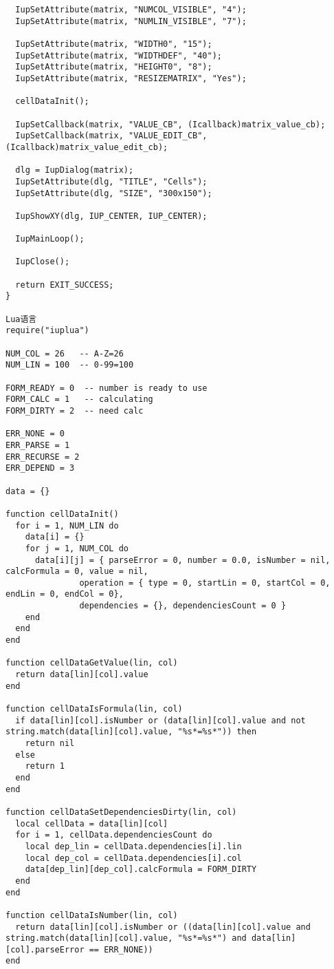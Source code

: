 \documentclass{ctexart}
\begin{document}
\begin{lstlisting}
  IupSetAttribute(matrix, "NUMCOL_VISIBLE", "4");
  IupSetAttribute(matrix, "NUMLIN_VISIBLE", "7");

  IupSetAttribute(matrix, "WIDTH0", "15");
  IupSetAttribute(matrix, "WIDTHDEF", "40");
  IupSetAttribute(matrix, "HEIGHT0", "8");
  IupSetAttribute(matrix, "RESIZEMATRIX", "Yes");

  cellDataInit();

  IupSetCallback(matrix, "VALUE_CB", (Icallback)matrix_value_cb);
  IupSetCallback(matrix, "VALUE_EDIT_CB", (Icallback)matrix_value_edit_cb);

  dlg = IupDialog(matrix);
  IupSetAttribute(dlg, "TITLE", "Cells");
  IupSetAttribute(dlg, "SIZE", "300x150");

  IupShowXY(dlg, IUP_CENTER, IUP_CENTER);

  IupMainLoop();

  IupClose();

  return EXIT_SUCCESS;
}

Lua语言
require("iuplua")

NUM_COL = 26   -- A-Z=26
NUM_LIN = 100  -- 0-99=100

FORM_READY = 0  -- number is ready to use
FORM_CALC = 1   -- calculating
FORM_DIRTY = 2  -- need calc

ERR_NONE = 0
ERR_PARSE = 1
ERR_RECURSE = 2
ERR_DEPEND = 3

data = {}

function cellDataInit()
  for i = 1, NUM_LIN do
    data[i] = {}
    for j = 1, NUM_COL do
      data[i][j] = { parseError = 0, number = 0.0, isNumber = nil, calcFormula = 0, value = nil,
               operation = { type = 0, startLin = 0, startCol = 0, endLin = 0, endCol = 0},
               dependencies = {}, dependenciesCount = 0 }
    end
  end
end

function cellDataGetValue(lin, col)
  return data[lin][col].value
end

function cellDataIsFormula(lin, col)
  if data[lin][col].isNumber or (data[lin][col].value and not string.match(data[lin][col].value, "%s*=%s*")) then
    return nil
  else
    return 1
  end
end

function cellDataSetDependenciesDirty(lin, col)
  local cellData = data[lin][col]
  for i = 1, cellData.dependenciesCount do
    local dep_lin = cellData.dependencies[i].lin
    local dep_col = cellData.dependencies[i].col
    data[dep_lin][dep_col].calcFormula = FORM_DIRTY
  end
end

function cellDataIsNumber(lin, col)
  return data[lin][col].isNumber or ((data[lin][col].value and string.match(data[lin][col].value, "%s*=%s*") and data[lin][col].parseError == ERR_NONE))
end


\end{lstlisting}
\end{document}
